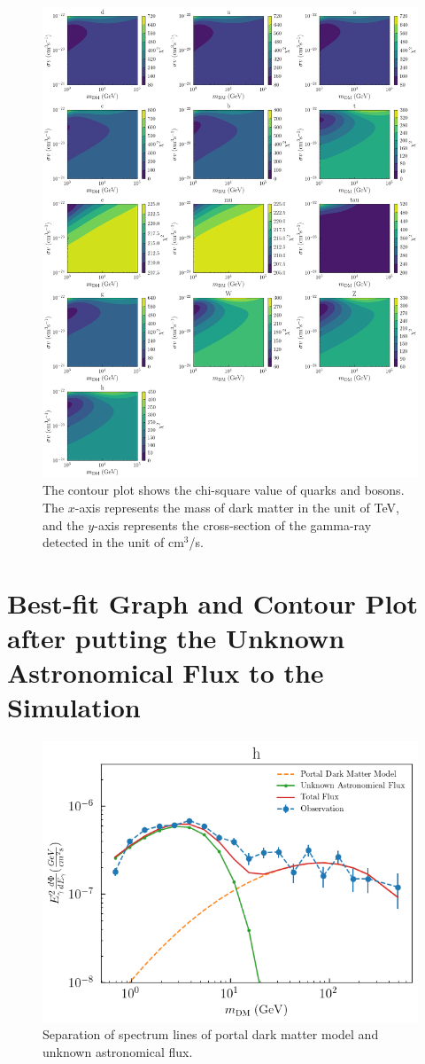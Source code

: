 \documentclass[10pt, oneside]{book}
\numberwithin{equation}{chapter}
\begin{document}
\begin{figure}[h]
    \centering
    \includegraphics[width=\linewidth]{images/Contour_Best_Fit_not_all_2.png}
    \caption{The contour plot shows the chi-square value of quarks and bosons. The $x$-axis represents the mass of dark matter in the unit of TeV, and the $y$-axis represents the cross-section of the gamma-ray detected in the unit of cm$^3$/s.}
    \label{fig: contour}
\end{figure}

\FloatBarrier
\newpage

\section{Best-fit Graph and Contour Plot after putting the Unknown Astronomical Flux to the Simulation}

\begin{figure}[h]
    \centering
    \includegraphics[width=0.5\linewidth]{images/partial_flux_3.png}
    \caption{Separation of spectrum lines of portal dark matter model and unknown astronomical flux.}
    \label{fig: partial flux}
\end{figure}
\end{document}
